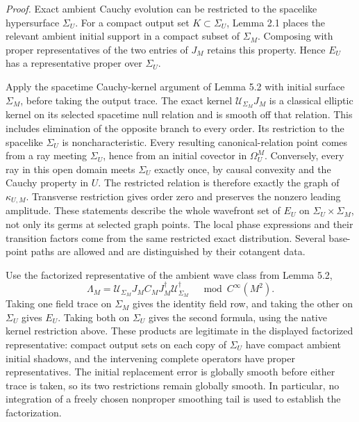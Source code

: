 \documentclass[
  english,
  11pt,
  reqno]{amsart}
\begin{document}
\emph{Proof.} Exact ambient Cauchy evolution can be restricted to the
spacelike hypersurface \(\Sigma_U\). For a compact output set
\(K\subset\Sigma_U\), Lemma 2.1 places the relevant ambient initial
support in a compact subset of \(\Sigma_M\). Composing with proper
representatives of the two entries of \(J_M\) retains this property.
Hence \(E_U\) has a representative proper over \(\Sigma_U\).

Apply the spacetime Cauchy-kernel argument of Lemma 5.2 with initial
surface \(\Sigma_M\), before taking the output trace. The exact kernel
\(\mathcal U_{\Sigma_M}J_M\) is a classical elliptic kernel on its
selected spacetime null relation and is smooth off that relation. This
includes elimination of the opposite branch to every order. Its
restriction to the spacelike \(\Sigma_U\) is noncharacteristic. Every
resulting canonical-relation point comes from a ray meeting
\(\Sigma_U\), hence from an initial covector in \(\Omega_U^M\).
Conversely, every ray in this open domain meets \(\Sigma_U\) exactly
once, by causal convexity and the Cauchy property in \(U\). The
restricted relation is therefore exactly the graph of \(\kappa_{U,M}\).
Transverse restriction gives order zero and preserves the nonzero
leading amplitude. These statements describe the whole wavefront set of
\(E_U\) on \(\Sigma_U\times\Sigma_M\), not only its germs at selected
graph points. The local phase expressions and their transition factors
come from the same restricted exact distribution. Several base-point
paths are allowed and are distinguished by their cotangent data.

Use the factorized representative of the ambient wave class from Lemma
5.2, \[
\Lambda_M
=\mathcal U_{\Sigma_M}J_M C_MJ_M^{\dagger}
  \mathcal U_{\Sigma_M}^{\dagger}
\quad\bmod C^\infty(M^2).
\] Taking one field trace on \(\Sigma_M\) gives the identity field row,
and taking the other on \(\Sigma_U\) gives \(E_U\). Taking both on
\(\Sigma_U\) gives the second formula, using the native kernel
restriction above. These products are legitimate in the displayed
factorized representative: compact output sets on each copy of
\(\Sigma_U\) have compact ambient initial shadows, and the intervening
complete operators have proper representatives. The initial replacement
error is globally smooth before either trace is taken, so its two
restrictions remain globally smooth. In particular, no integration of a
freely chosen nonproper smoothing tail is used to establish the
factorization.
\end{document}
